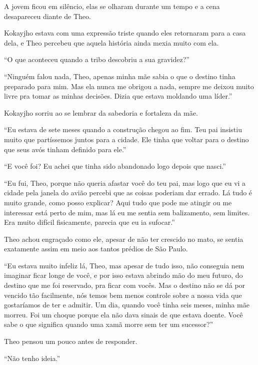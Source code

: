 A jovem ficou em silêncio, elas se olharam durante um tempo e a cena
desapareceu diante de Theo.

\asterisc


Kokayjho estava com uma expressão triste quando eles retornaram para a
casa dela, e Theo percebeu que aquela história ainda mexia muito com ela.

``O que aconteceu quando a tribo descobriu a sua gravidez?''

``Ninguém falou nada, Theo, apenas minha mãe sabia o que o destino tinha
preparado para mim. Mas ela nunca me obrigou a nada, sempre me deixou
muito livre pra tomar as minhas decisões. Dizia que estava moldando uma
líder.''

Kokayjho sorriu ao se lembrar da sabedoria e fortaleza da mãe.

``Eu estava de sete meses quando a construção chegou ao fim. Teu pai
insistiu muito que partíssemos juntos para a cidade. Ele tinha que
voltar para o destino que seus avós tinham definido para ele.''

``E você foi? Eu achei que tinha sido abandonado logo depois que
nasci.''

``Eu fui, Theo, porque não queria afastar você do teu pai, mas logo que
eu vi a cidade pela janela do avião percebi que as coisas poderiam dar
errado. Lá tudo é muito grande, como posso explicar? Aqui tudo que pode
me atingir ou me interessar está perto de mim, mas lá eu me sentia sem
balizamento, sem limites. Era muito difícil fisicamente, parecia que eu
ia sufocar.''

Theo achou engraçado como ele, apesar de não ter crescido no mato, se
sentia exatamente assim em meio aos tantos prédios de São Paulo.

``Eu estava muito infeliz lá, Theo, mas apesar de tudo isso, não
conseguia nem imaginar ficar longe de você, e por isso estava abrindo mão
do meu futuro, do destino que me foi reservado, pra ficar com vocês. Mas
o destino não se dá por vencido tão facilmente, nós temos bem menos
controle sobre a nossa vida que gostaríamos de ter e admitir. Um dia,
quando você tinha seis meses, minha mãe morreu. Foi um choque porque ela
não dava sinais de que estava doente. Você sabe o que significa quando
uma xamã morre sem ter um sucessor?''

Theo pensou um pouco antes de responder.

``Não tenho ideia.''

